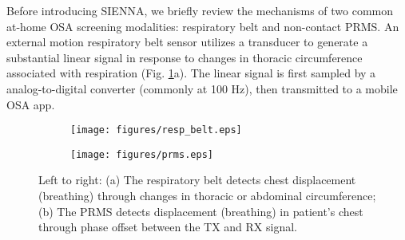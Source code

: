 Before introducing SIENNA, we briefly review the mechanisms of two common at-home OSA screening modalities: respiratory belt and non-contact PRMS. An external motion respiratory belt sensor utilizes a transducer to generate a substantial linear signal in response to changes in thoracic circumference associated with respiration (Fig. \ref{fig:preliminary}a). The linear signal is first sampled by a analog-to-digital converter (commonly at 100 Hz), then transmitted to a mobile OSA app.

\begin{figure}[t]
\begin{subfigure}[t]{0.23\textwidth}
\texttt{[image: figures/resp\_belt.eps]}
\end{subfigure}
\hspace{\fill}
\begin{subfigure}[t]{0.23\textwidth}
\texttt{[image: figures/prms.eps]}
\end{subfigure}
\caption{Left to right: (a) The respiratory belt detects chest displacement (breathing) through changes in thoracic or abdominal circumference; (b) The PRMS detects displacement (breathing) in patient's chest through phase offset between the TX and RX signal.}
\label{fig:preliminary}
\vspace{-15pt}
\end{figure}


